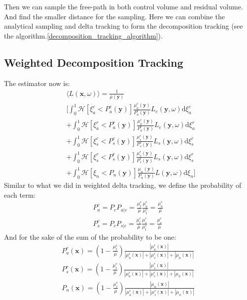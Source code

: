 \documentclass[acmtog]{acmart}
\begin{document}
Then we can sample the free-path in both control volume and residual volume.
And find the smaller distance for the sampling.
Here we can combine the analytical sampling and delta tracking to form the decomposition tracking (see the algorithm.\ref{decomposition_tracking_algorithm}).

\subsection{Weighted Decomposition Tracking}
The estimator now is:
\begin{equation}
	\begin{aligned}
	&\langle L(\mathbf x, \omega)\rangle=\frac{1}{\bar\mu(\mathbf y)}\\
	&[\int_0^1\mathcal H[\xi_a^c<P_a^c(\mathbf y)]\frac{\mu_a^c(\mathbf y)}{P_a^c(\mathbf y)}L_e(\mathbf y, \omega)\mathrm d\xi_a^c\\
	&+\int_0^1\mathcal H[\xi_a^r<P_a^r(\mathbf y)]\frac{\mu_a^c(\mathbf y)}{P_a^r(\mathbf y)}L_e(\mathbf y, \omega)\mathrm d\xi_a^r\\
	&+\int_0^1\mathcal H[\xi_s^c<P_s^c(\mathbf y)]\frac{\mu_s^c(\mathbf y)}{P_s^c(\mathbf y)}L_s(\mathbf y, \omega)\mathrm d\xi_s^c\\
	&+\int_0^1\mathcal H[\xi_s^r<P_s^r(\mathbf y)]\frac{\mu_s^c(\mathbf y)}{P_s^r(\mathbf y)}L_s(\mathbf y, \omega)\mathrm d\xi_s^r\\
	&+\int_0^1\mathcal H[\xi_n<P_n(\mathbf y)]\frac{\mu_n(\mathbf y)}{P_n(\mathbf y)}L(\mathbf y, \omega)\mathrm d\xi_n]
	\end{aligned}
\end{equation}
Similar to what we did in weighted delta tracking, we define the probability of each term:
\begin{equation}
	\begin{aligned}
		P_a^c=P_cP_{a|c}=\frac{\mu_t^c}{\bar\mu}\frac{\mu_a^c}{\mu_t^c}=\frac{\mu_a^c}{\bar\mu}\\
		P_s^c=P_cP_{s|c}=\frac{\mu_t^c}{\bar\mu}\frac{\mu_s^c}{\mu_t^c}=\frac{\mu_s^c}{\bar\mu}
	\end{aligned}
\end{equation}
And for the sake of the sum of the probability to be one:
\begin{equation}
	\begin{aligned}
		P_a^r(\mathbf x)=\left(1-\frac{\mu_t^c}{\bar\mu}\right)\frac{|\mu_a^r(\mathbf x)|}{|\mu_a^r(\mathbf x)|+|\mu_s^r(\mathbf x)|+|\mu_n(\mathbf x)|}\\
	P_s^r(\mathbf x)=\left(1-\frac{\mu_t^c}{\bar\mu}\right)\frac{|\mu_s^r(\mathbf x)|}{|\mu_a^r(\mathbf x)|+|\mu_s^r(\mathbf x)|+|\mu_n(\mathbf x)|}\\
	P_n(\mathbf x)=\left(1-\frac{\mu_t^c}{\bar\mu}\right)\frac{|\mu_n(\mathbf x)|}{|\mu_a^r(\mathbf x)|+|\mu_s^r(\mathbf x)|+|\mu_n(\mathbf x)|}
	\end{aligned}
\end{equation}
\end{document}
